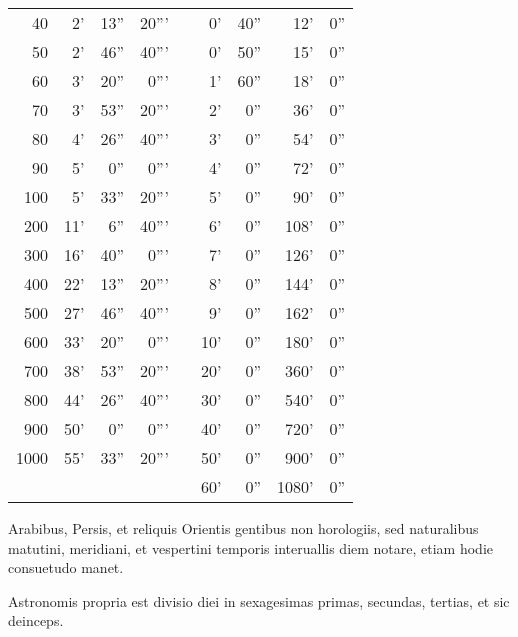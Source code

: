 \begin{wraptable}{r}{0mm}
\begin{tabular}{ |r @{}| r  r  r | c |r | r | r r | }
  40 &  2' & 13'' & 20''' & &  0' & 40'' &   12' &   0'' \\
\cline{2-4} \cline{8-9}
  50 &  2' & 46'' & 40''' & &  0' & 50'' &   15' &   0'' \\
\cline{2-4} \cline{8-9}
  60 &  3' & 20'' &  0''' & &  1' & 60'' &   18' &   0'' \\
\cline{2-4} \cline{8-9}
  70 &  3' & 53'' & 20''' & &  2' &  0'' &   36' &   0'' \\
\cline{2-4} \cline{8-9}
  80 &  4' & 26'' & 40''' & &  3' &  0'' &   54' &   0'' \\
\cline{2-4} \cline{8-9}
  90 &  5' &  0'' &  0''' & &  4' &  0'' &   72' &   0'' \\
\cline{2-4} \cline{8-9}
 100 &  5' & 33'' & 20''' & &  5' &  0'' &   90' &   0'' \\
\cline{2-4} \cline{8-9}
 200 & 11' &  6'' & 40''' & &  6' &  0'' &  108' &   0'' \\
\cline{2-4} \cline{8-9}
 300 & 16' & 40'' &  0''' & &  7' &  0'' &  126' &   0'' \\
\cline{2-4} \cline{8-9}
 400 & 22' & 13'' & 20''' & &  8' &  0'' &  144' &   0'' \\
\cline{2-4} \cline{8-9}
 500 & 27' & 46'' & 40''' & &  9' &  0'' &  162' &   0'' \\
\cline{2-4} \cline{8-9}
 600 & 33' & 20'' &  0''' & & 10' &  0'' &  180' &   0'' \\
\cline{2-4} \cline{8-9}
 700 & 38' & 53'' & 20''' & & 20' &  0'' &  360' &   0'' \\
\cline{2-4} \cline{8-9}
 800 & 44' & 26'' & 40''' & & 30' &  0'' &  540' &   0'' \\
\cline{2-4} \cline{8-9}
 900 & 50' &  0'' &  0''' & & 40' &  0'' &  720' &   0'' \\
\cline{2-4} \cline{8-9}
1000 & 55' & 33'' & 20''' & & 50' &  0'' &  900' &   0'' \\
\cline{1-4} \cline{8-9}
\multicolumn{4}{c}{}      & & 60' &  0'' & 1080' &   0'' \\
            \cline{6-9}
\end{tabular}
\end{wraptable}


Arabibus, Persis, et reliquis Orientis
gentibus non horologiis, sed
naturalibus matutini, meridiani,
et vespertini temporis
interuallis diem notare,
etiam hodie consuetudo manet.

Astronomis propria
est divisio diei in sexagesimas
primas, secundas, tertias,
et sic deinceps.

